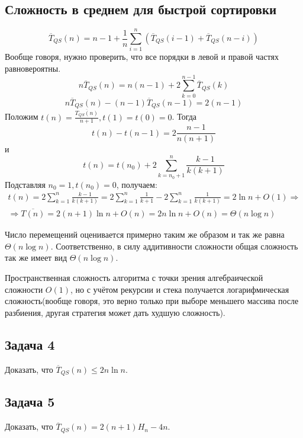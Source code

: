 \documentclass[11pt]{article}
\begin{document}
\subsection{Сложность в среднем для быстрой сортировки}
\label{sec:orgbd7b587}
   \begin{equation}
\overline{T}_{QS}(n) = n - 1 + \frac1n\sum_{i = 1}^n\left(\overline{T}_{QS}(i - 1) +
\overline{T}_{QS}(n - i)\right)
   \end{equation}
Вообще говоря, нужно проверить, что все порядки в левой и правой частях равновероятны.
\begin{equation}
n\overline{T}_{QS}(n) = n(n - 1) + 2\sum_{k = 0}^{n - 1}\overline{T}_{QS}(k)
\end{equation}
\begin{equation}
n\overline{T}_{QS}(n) - (n - 1)\overline{T}_{QS}(n - 1) = 2(n - 1)
\end{equation}
Положим $t(n) = \frac{\overline{T_{QS}(n)}}{n + 1}, t(1) = t(0) = 0$. Тогда
\begin{equation}
t(n) - t(n - 1) = 2\frac{n - 1}{n(n + 1)}
\end{equation}
и
\begin{equation}
t(n) = t(n_0) + 2\sum_{k = n_0 + 1}^n\frac{k - 1}{k(k + 1)}
\end{equation}
Подставляя $n_0 = 1, t(n_0) = 0$, получаем:
\begin{multline}
t(n) = 2\sum_{k = 1}^n\frac{k - 1}{k(k + 1)} = 2\sum_{k = 1}^n\frac1{k + 1} - 2\sum_{k = 1}^n\frac1{k(k + 1)}
= 2\ln n + O(1) \Rightarrow \\
\Rightarrow \overline{T(n)} = 2(n + 1)\ln n + O(n) = 2n\ln n + O(n) = \Theta(n\log n)
\end{multline}

Число перемещений оценивается примерно таким же образом и так же равна \(\Theta(n\log n)\).
Соответственно, в силу аддитивности сложности общая сложность так же имеет вид \(\Theta(n\log n)\).

Пространственная сложность алгоритма с точки зрения алгебраической сложности \(O(1)\), но с
учётом рекурсии и стека получается логарифмическая сложность(вообще говоря, это верно только
при выборе меньшего массива после разбиения, другая стратегия может дать худшую сложность).
\subsection{Задача 4}
\label{sec:org503bb2f}
Доказать, что \(\overline{T}_{QS}(n) \leq 2n\ln n\).
\subsection{Задача 5}
\label{sec:org54ab27b}
Доказать, что \(\overline{T}_{QS}(n) = 2(n + 1)H_n - 4n\).
\end{document}
